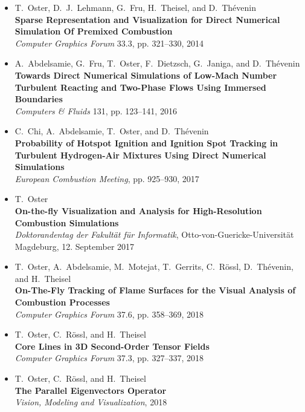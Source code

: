 \documentclass[oneside]{scrartcl}
\author{Timo Oster}
\date{26. April 2019}
\begin{document}
%
\begin{itemize}[label={},leftmargin=0pt]
    \item T.~Oster, D.~J.~Lehmann, G.~Fru, H.~Theisel, and D.~Th\'evenin\\
        \textbf{Sparse Representation and Visualization for Direct Numerical
        Simulation Of Premixed Combustion}\\
        {\emph{Computer Graphics Forum} 33.3, pp. 321--330, 2014}

    \item A.~Abdelsamie, G.~Fru, T.~Oster, F.~Dietzsch, G.~Janiga,
        and D.~Thévenin\\
        \textbf{Towards Direct Numerical Simulations of Low-Mach Number
        Turbulent Reacting and Two-Phase Flows Using Immersed Boundaries}\\
        {\emph{Computers \& Fluids} 131, pp. 123--141, 2016}

    \item C.~Chi, A.~Abdelsamie, T.~Oster, and D.~Thévenin\\
        \textbf{Probability of Hotspot Ignition and Ignition Spot Tracking in
        Turbulent Hydrogen-Air Mixtures Using Direct Numerical Simulations}\\
        {\emph{ European Combustion Meeting}, pp. 925--930, 2017}

    \item T.~Oster\\
        \textbf{On-the-fly Visualization and Analysis for High-Resolution Combustion Simulations}\\
        \emph{Doktorandentag der Fakultät für Informatik}, Otto-von-Guericke-Universität Magdeburg, 12. September 2017

    \item T.~Oster, A.~Abdelsamie, M.~Motejat, T.~Gerrits, C.~R\"ossl,
        D.~Thévenin, and H.~Theisel\\
        \textbf{On-The-Fly Tracking of Flame Surfaces for the Visual Analysis
        of Combustion Processes}\\
        {\emph{Computer Graphics Forum} 37.6, pp. 358--369, 2018}

    \item T.~Oster, C.~R\"ossl, and H.~Theisel\\
        \textbf{Core Lines in 3D Second-Order Tensor Fields}\\
        {\emph{Computer Graphics Forum} 37.3, pp. 327--337, 2018}

    \item T.~Oster, C.~R\"ossl, and H.~Theisel\\
        \textbf{The Parallel Eigenvectors Operator}\\
        {\emph{Vision, Modeling and Visualization}, 2018}
\end{itemize}
\end{document}
